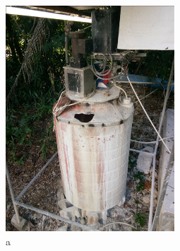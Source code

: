 \begin{figure}
	\begin{minipage}[b]{0.3\linewidth}
		\centering
		\includegraphics[width=\textwidth]{figures/fig_ch043_tank_crack}
		\caption*{a}
	\end{minipage}
	\hspace{0.05cm}
	\begin{minipage}[b]{0.3\linewidth}
		\centering

\end{minipage}
\end{figure}
